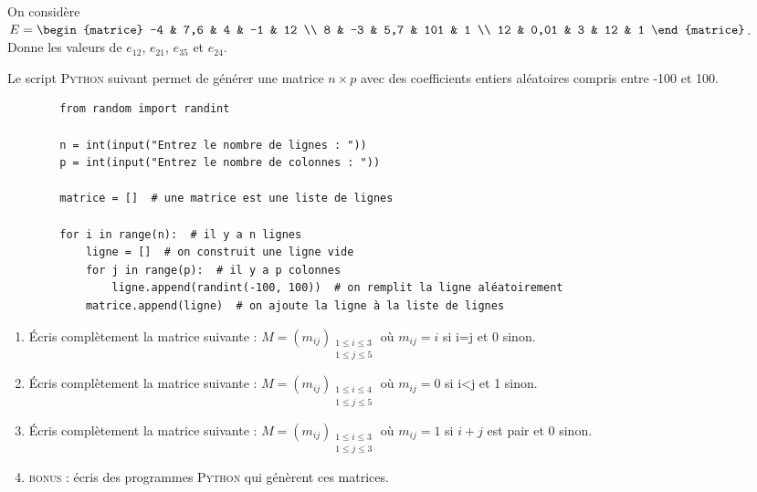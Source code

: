 \begin{exercice}[]
	On considère 	$E =	\begin{matrice}
			-4      & 7,6 & 4 & -1 & 12 \\
			8 & -3  & 5,7 & 101 & 1 \\
			12 & 0,01 & 3 & 12 & 1
		\end{matrice}$.\\
	
	Donne les valeurs de $e_{12}$, $e_{21}$, $e_{35}$ et $e_{24}$.
\end{exercice}

Le script \textsc{Python} suivant permet de générer une matrice $n\times p$ avec des coefficients entiers aléatoires compris entre -100 et 100.

\begin{pyc}
	\begin{verbatim}
		from random import randint

		n = int(input("Entrez le nombre de lignes : "))
		p = int(input("Entrez le nombre de colonnes : "))

		matrice = []  # une matrice est une liste de lignes

		for i in range(n):  # il y a n lignes
			ligne = []  # on construit une ligne vide
			for j in range(p):  # il y a p colonnes
				ligne.append(randint(-100, 100))  # on remplit la ligne aléatoirement
			matrice.append(ligne)  # on ajoute la ligne à la liste de lignes
	\end{verbatim}
\end{pyc}
\begin{exercice}[]
	\begin{enumerate}
		\item \'Ecris complètement la matrice suivante : $M=(m_{ij})_{\substack{1\leqslant i\leqslant 3\\1\leqslant j\leqslant 5}}$ où $m_{ij}=i$ si i=j et 0 sinon.
		\item 	\'Ecris complètement la matrice suivante : $M=(m_{ij})_{\substack{1\leqslant i\leqslant 4\\1\leqslant j\leqslant 5}}$ où $m_{ij}=0$ si i<j et 1 sinon.
		\item 	\'Ecris complètement la matrice suivante : $M=(m_{ij})_{\substack{1\leqslant i\leqslant 3\\1\leqslant j\leqslant 3}}$ où $m_{ij}=1$ si $i+j$ est pair et 0 sinon.
		\item \textsc{bonus} : écris des programmes \textsc{Python} qui génèrent ces matrices.
	\end{enumerate}
\end{exercice}

